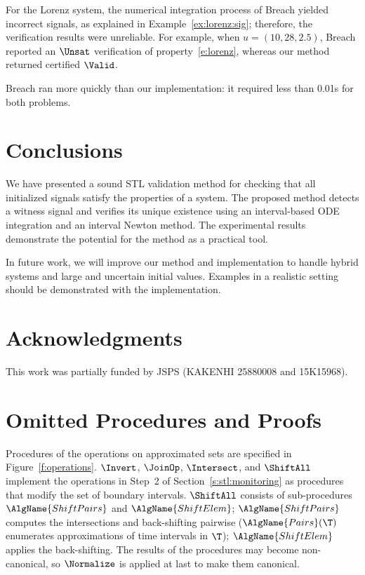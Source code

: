 \documentclass[paper]{ieice}
\begin{document}
For the Lorenz system, the numerical integration process of Breach yielded incorrect signals, as explained in Example~\ref{ex:lorenz:sig}; therefore, the verification results were unreliable. 
For example, when $u = (10,28,2.5)$, Breach reported an $\Unsat$ verification of property~\eqref{e:lorenz}, whereas our method returned certified $\Valid$.

Breach ran more quickly than our implementation: it required less than 0.01s for both problems.


\section{Conclusions}

We have presented a sound STL validation method for checking that all initialized signals satisfy the properties of a system.
The proposed method detects a witness signal and verifies its unique existence using an interval-based ODE integration and an interval Newton method.
The experimental results demonstrate the potential for the method as a practical tool.


In future work, we will improve our method and implementation to handle hybrid systems and large and uncertain initial values.
Examples in a realistic setting should be demonstrated with the implementation.

\section*{Acknowledgments}

This work was partially funded by JSPS (KAKENHI 25880008 and 15K15968).






\appendix*
\section{Omitted Procedures and Proofs}

Procedures of the operations on approximated sets are specified in Figure~\ref{f:operations}.
$\Invert$, $\JoinOp$, $\Intersect$, and $\ShiftAll$ implement the operations in Step~2 of Section~\ref{s:stl:monitoring} as procedures that modify the set of boundary intervals.
$\ShiftAll$ consists of sub-procedures $\AlgName{ShiftPairs}$ and $\AlgName{ShiftElem}$; $\AlgName{ShiftPairs}$ computes the intersections and back-shifting pairwise ($\AlgName{Pairs}(\T)$ enumerates approximations of time intervals in $\T$); $\AlgName{ShiftElem}$ applies the back-shifting.
The results of the procedures may become non-canonical, so $\Normalize$ is applied at last to make them canonical.
\end{document}
